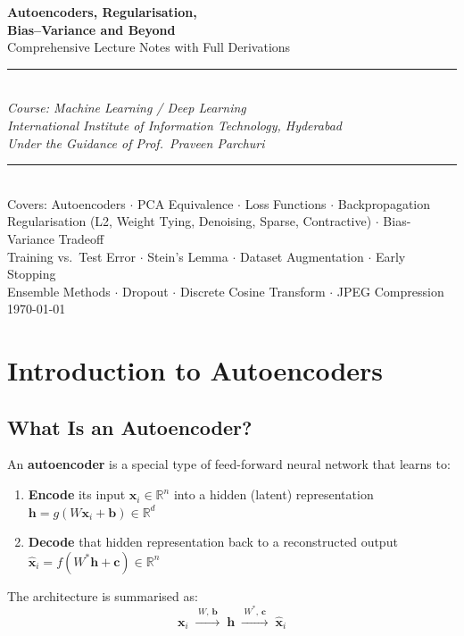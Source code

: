 \documentclass[12pt,a4paper]{article}
\newcommand{\R}{\mathbb{R}}
\newcommand{\vx}{\mathbf{x}}
\newcommand{\vh}{\mathbf{h}}
\newcommand{\vb}{\mathbf{b}}
\newcommand{\vc}{\mathbf{c}}
\newcommand{\hatx}{\hat{\mathbf{x}}}
\begin{document}

\begin{titlepage}
  \centering
  \vspace*{2cm}
  {\Huge\bfseries\color{headcolor}
    Autoencoders, Regularisation,\\[0.5em]
    Bias--Variance and Beyond\\[1em]}
  {\Large\color{defcolor} Comprehensive Lecture Notes with Full Derivations}\\[2em]
  \rule{\textwidth}{1.5pt}\\[1em]
  {\large\textit{Course: Machine Learning / Deep Learning}}\\[0.5em]
  {\large\textit{International Institute of Information Technology, Hyderabad}}\\[0.5em]
  {\large\textit{Under the Guidance of Prof.\ Praveen Parchuri}}\\[2em]
  \rule{\textwidth}{0.5pt}\\[1em]
  {\normalsize Covers: Autoencoders $\cdot$ PCA Equivalence $\cdot$ Loss Functions $\cdot$ Backpropagation\\
  Regularisation (L2, Weight Tying, Denoising, Sparse, Contractive) $\cdot$
  Bias-Variance Tradeoff\\
  Training vs.\ Test Error $\cdot$ Stein's Lemma $\cdot$ Dataset Augmentation $\cdot$ Early Stopping\\
  Ensemble Methods $\cdot$ Dropout $\cdot$ Discrete Cosine Transform $\cdot$ JPEG Compression}
  \vfill
  {\large\today}
\end{titlepage}

\tableofcontents
\newpage

\section{Introduction to Autoencoders}

\subsection{What Is an Autoencoder?}

\begin{definitionbox}
An \textbf{autoencoder} is a special type of feed-forward neural network that learns to:
\begin{enumerate}
  \item \textbf{Encode} its input $\vx_i \in \R^n$ into a hidden (latent) representation
    $\vh = g(W\vx_i + \vb) \in \R^d$
  \item \textbf{Decode} that hidden representation back to a reconstructed output
    $\hatx_i = f(W^*\vh + \vc) \in \R^n$
\end{enumerate}

The architecture is summarised as:
\[
  \vx_i
    \;\xrightarrow{\;W,\,\vb\;}\;
  \vh
    \;\xrightarrow{\;W^*,\,\vc\;}\;
  \hatx_i
\]
\end{definitionbox}
\end{document}
